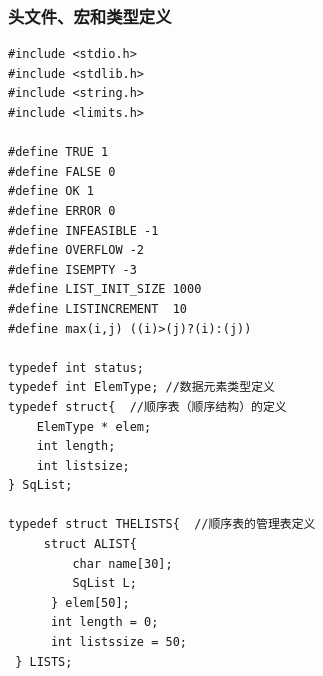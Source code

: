 \documentclass[supercite]{Experimental_Report}
\theoremstyle{definition}
\begin{document}
\subsubsection{头文件、宏和类型定义}
\begin{lstlisting}
#include <stdio.h>
#include <stdlib.h>
#include <string.h>
#include <limits.h>

#define TRUE 1
#define FALSE 0
#define OK 1
#define ERROR 0
#define INFEASIBLE -1
#define OVERFLOW -2
#define ISEMPTY -3
#define LIST_INIT_SIZE 1000
#define LISTINCREMENT  10
#define max(i,j) ((i)>(j)?(i):(j))

typedef int status;
typedef int ElemType; //数据元素类型定义
typedef struct{  //顺序表（顺序结构）的定义
    ElemType * elem;
    int length;
    int listsize;
} SqList;

typedef struct THELISTS{  //顺序表的管理表定义
	 struct ALIST{
		 char name[30];
		 SqList L;
	  } elem[50];
	  int length = 0;
	  int listssize = 50;
 } LISTS;
\end{lstlisting}
\end{document}
